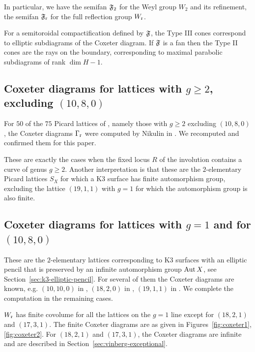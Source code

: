 \documentclass{amsart}
\begin{document}
In particular, we have the semifan ${\mathfrak F}_2$ for the Weyl group $W_2$
and its refinement, the semifan ${\mathfrak F}_{\rm r}$ for the full reflection group
$W_{\rm r}$.

For a semitoroidal compactification defined by ${\mathfrak F}$, the Type III
cones correspond to elliptic subdiagrams of the Coxeter diagram. If
${\mathfrak F}$ is a fan then the Type II cones are the rays on the boundary,
corresponding to maximal parabolic subdiagrams of rank $\dim H-1$. 


\subsection{Coxeter diagrams for lattices with $g\ge2$, excluding
  $(10,8,0)$}
\label{sec:vinberg-g>1}

For $50$ of the $75$ Picard lattices of \fign, namely those with
$g\ge2$ excluding $(10,8,0)$, the Coxeter diagrams $\Gamma_{\rm r}$ were computed by
Nikulin in \cite[Table 1]{alexeev2006del-pezzo}. We recomputed and
confirmed them for this paper.

These are exactly the cases when the fixed locus $R$ of the involution
contains a curve of genus $g\ge2$. Another interpretation is that
these are the $2$-elementary Picard lattices $S_X$ for which a K3
surface has finite automorphism group, excluding the lattice
$(19,1,1)$ with $g=1$ for which the automorphism group is also finite.


\subsection{Coxeter diagrams for lattices with $g=1$ and for $(10,8,0)$}
\label{sec:vinberg-g=1}

These are the $2$-elementary lattices corresponding to K3 surfaces
with an elliptic pencil that is preserved by an infinite automorphism
group $\operatorname{Aut} X$, see Section~\ref{sec:k3-elliptic-pencil}.  For several
of them the Coxeter diagrams are known, e.g.  $(10,10,0)$ in
\cite{vinberg1973some-arithmetic}, $(18,2,0)$ in
\cite{vinberg1978the-groups}, $(19,1,1)$ in
\cite{kondo1989algebraic-k3}. We complete the computation in the
remaining cases.

\begin{theorem}\label{thm:finite-covolume}
  $W_{\rm r}$ has finite covolume for all the lattices on the $g=1$ line
  except for $(18,2,1)$ and $(17,3,1)$. The finite Coxeter diagrams are as given in
  Figures~\ref{fig:coxeter1}, \ref{fig:coxeter2}.
  For $(18,2,1)$ and $(17,3,1)$, the Coxeter diagrams are infinite
  and are described in Section~\ref{sec:vinberg-exceptional}.
\end{theorem}
\end{document}
